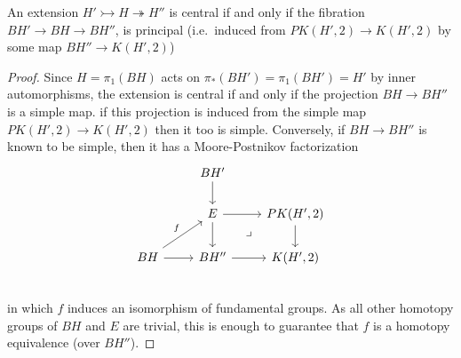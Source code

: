\begin{lemma}
  An extension $H'\rightarrowtail H \twoheadrightarrow H''$ is central if and only if the fibration $BH' \rightarrow  BH\rightarrow  BH''$, is principal (i.e.\  induced from $PK(H', 2)\longrightarrow K(H', 2)$ by some map $BH''\longrightarrow K(H', 2)$)
\end{lemma}
\begin{proof}
Since $H = \pi_1 (BH)$ acts on $\pi_*(BH') = \pi_1 (BH') = H'$ by inner automorphisms, the
extension is central if and only if the projection $BH \longrightarrow BH''$ is a simple map. if this projection is induced from the simple map $PK(H', 2) \longrightarrow K(H', 2)$ then it too is simple. Conversely, if $BH \longrightarrow BH''$ is known to be simple, then it has a Moore-Postnikov factorization
\[
\begin{tikzcd}
  & BH' \arrow[d] & \\
  & E \arrow[d] \arrow[r] \arrow[dr, phantom, "\lrcorner"] &PK(H',2) \arrow[d] \\
 BH \arrow[ru,"f"] \arrow[r] &BH'' \arrow[r] & K(H',2)\\  
\end{tikzcd}
\]
 in which $f$ induces an isomorphism of fundamental groups. As all other homotopy groups of $BH$ and $E$ are trivial, this is enough to guarantee that $f$ is a homotopy equivalence (over $BH''$).
\end{proof}

